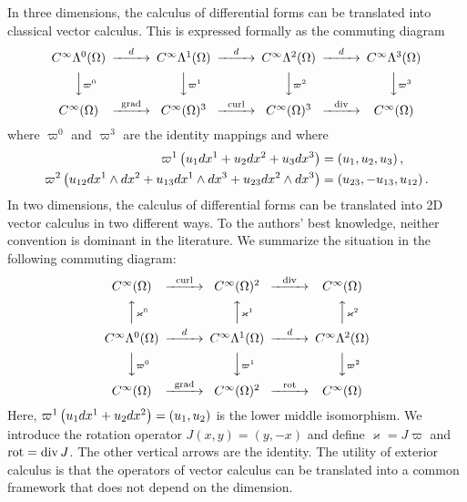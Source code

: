 \documentclass[10pt,letterpaper]{article}
\begin{document}
\begin{remark}
    In three dimensions, 
    the calculus of differential forms can be translated into classical vector calculus. 
    This is expressed formally as the commuting diagram 
    \begin{gather*}
    \begin{CD}
        C^\infty\Alt^0(\Omega) @>{\cartan}>> C^\infty\Alt^1(\Omega) @>{\cartan}>> C^\infty\Alt^2(\Omega) @>{\cartan}>> C^\infty\Alt^3(\Omega) 
        \\
        @VV{\varpi^{0}}V 
        @VV{\varpi^{1}}V 
        @VV{\varpi^{2}}V 
        @VV{\varpi^{3}}V 
        \\
        C^\infty(\Omega) @>{\grad}>> C^\infty(\Omega)^{3} @>{\curl}>> C^\infty(\Omega)^{3} @>{\divergence}>> C^\infty(\Omega)
    \end{CD}
    \end{gather*}
    where $\varpi^{0}$ and $\varpi^{3}$ are the identity mappings and where 
    \begin{align*}
     \varpi^{1}\left( u_1 dx^{1} + u_2 dx^{2} + u_3 dx^{3} \right) 
     &= 
     \left( u_1, u_2, u_3 \right), 
     \\
     \varpi^{2}\left( u_{12} dx^{1} \wedge dx^{2} + u_{13} dx^{1} \wedge dx^{3} + u_{23} dx^{2} \wedge dx^{3} \right) 
     &= 
     \left( u_{23}, - u_{13}, u_{12} \right).   
    \end{align*}
    In two dimensions, 
    the calculus of differential forms can be translated into 2D vector calculus in two different ways. 
    To the authors' best knowledge, neither convention is dominant in the literature.
    We summarize the situation in the following commuting diagram: 
    \begin{gather*} 
    \begin{CD}
        C^\infty(\Omega) @>{\curl}>> C^\infty(\Omega)^{2} @>{\divergence}>> C^\infty(\Omega)
        \\
        @AA{\varkappa^{0}}A 
        @AA{\varkappa^{1}}A 
        @AA{\varkappa^{2}}A 
        \\
        C^\infty\Alt^0(\Omega) @>{\cartan}>> C^\infty\Alt^1(\Omega) @>{\cartan}>> C^\infty\Alt^2(\Omega) 
        \\
        @VV{\varpi^{0}}V 
        @VV{\varpi^{1}}V 
        @VV{\varpi^{2}}V 
        \\
        C^\infty(\Omega) @>{\grad}>> C^\infty(\Omega)^{2} @>{\rot}>> C^\infty(\Omega)
    \end{CD}
    \end{gather*}
    Here, $\varpi^{1}\left( u_1 dx^{1} + u_2 dx^{2} \right) = \left( u_1, u_2 \right)$ is the lower middle isomorphism. We introduce the rotation operator $J(x,y) = (y,-x)$ and define $\varkappa = J \varpi$ and $\operatorname{rot} = \operatorname{div} J$.
    The other vertical arrows are the identity. 
    The utility of exterior calculus is that the operators of vector calculus can be translated into a common framework that does not depend on the dimension.
\end{remark}
\end{document}
